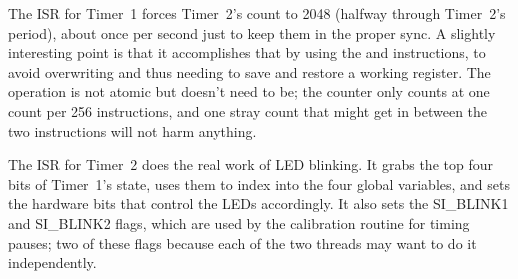 The ISR for Timer~1 forces Timer~2's count to 2048 (halfway through
Timer~2's period), about once per second just to keep them in the proper
sync.  A slightly interesting point is that it accomplishes that by using
the  and  instructions, to avoid overwriting and thus
needing to save and restore a working register.  The operation is not atomic
but doesn't need to be; the counter only counts at one count per 256
instructions, and one stray count that might get in between the two
instructions will not harm anything.

The ISR for Timer~2 does the real work of LED blinking.  It grabs the top
four bits of Timer~1's state, uses them to index into the four global
variables, and sets the hardware bits that control the LEDs accordingly.  It
also sets the SI\_BLINK1 and SI\_BLINK2 flags, which are used by the
calibration routine for timing pauses; two of these flags because each of
the two threads may want to do it independently.
